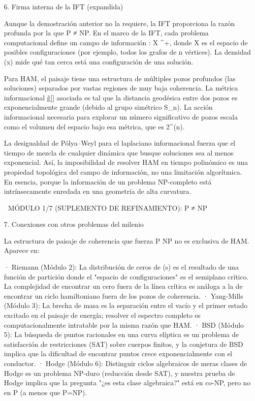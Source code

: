 \documentclass[12pt,a4paper]{book}
\begin{document}
6. Firma interna de la IFT (expandida)

Aunque la demostración anterior no la requiere, la IFT proporciona la razón profunda por la que P ≠ NP. En el marco de la IFT, cada problema computacional define un campo de información \rho: X \to {}^+, donde X es el espacio de posibles configuraciones (por ejemplo, todos los grafos de n vértices). La densidad \rho(x) mide qué tan cerca está una configuración de una solución.

Para HAM, el paisaje \rho tiene una estructura de múltiples pozos profundos (las soluciones) separados por vastas regiones de muy baja coherencia. La métrica informacional g̃[\rho] asociada es tal que la distancia geodésica entre dos pozos es exponencialmente grande (debido al grupo simétrico S_n). La acción informacional necesaria para explorar un número significativo de pozos escala como el volumen del espacio bajo esa métrica, que es 2^{\Omega(n)}.

La desigualdad de Pólya–Weyl para el laplaciano informacional fuerza que el tiempo de mezcla de cualquier dinámica que busque soluciones sea al menos exponencial. Así, la imposibilidad de resolver HAM en tiempo polinómico es una propiedad topológica del campo de información, no una limitación algorítmica. En esencia,  porque la información de un problema NP-completo está intrínsecamente enredada en una geometría de alta curvatura.

🧬 MÓDULO 1/7 (SUPLEMENTO DE REFINAMIENTO): P ≠ NP

7. Conexiones con otros problemas del milenio

La estructura de paisaje de coherencia que fuerza P \neq NP no es exclusiva de HAM. Aparece en:

· Riemann (Módulo 2): La distribución de ceros de \zeta(s) es el resultado de una función de partición donde el "espacio de configuraciones" es el semiplano crítico. La complejidad de encontrar un cero fuera de la línea crítica es análoga a la de encontrar un ciclo hamiltoniano fuera de los pozos de coherencia.
· Yang-Mills (Módulo 3): La brecha de masa es la separación entre el vacío y el primer estado excitado en el paisaje de energía; resolver el espectro completo es computacionalmente intratable por la misma razón que HAM.
· BSD (Módulo 5): La búsqueda de puntos racionales en una curva elíptica es un problema de satisfacción de restricciones (SAT) sobre cuerpos finitos, y la conjetura de BSD implica que la dificultad de encontrar puntos crece exponencialmente con el conductor.
· Hodge (Módulo 6): Distinguir ciclos algebraicos de meras clases de Hodge es un problema NP-duro (reducción desde SAT), y nuestra prueba de Hodge implica que la pregunta "¿es esta clase algebraica?" está en co-NP, pero no en P (a menos que P=NP).
\end{document}
